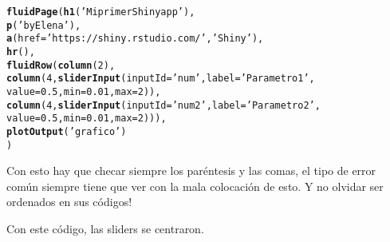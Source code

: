 \documentclass[11pt, oneside]{article}\usepackage[]{graphicx}\usepackage[]{color}
\makeatletter
\newcommand{\hlnum}[1]{\textcolor[rgb]{0.686,0.059,0.569}{#1}}%
\newcommand{\hlstr}[1]{\textcolor[rgb]{0.192,0.494,0.8}{#1}}%
\newcommand{\hlstd}[1]{\textcolor[rgb]{0.345,0.345,0.345}{#1}}%
\newcommand{\hlkwc}[1]{\textcolor[rgb]{0.333,0.667,0.333}{#1}}%
\newcommand{\hlkwd}[1]{\textcolor[rgb]{0.737,0.353,0.396}{\textbf{#1}}}%
\newenvironment{kframe}{%
 \def\at@end@of@kframe{}%
 \ifinner\ifhmode%
  \def\at@end@of@kframe{\end{minipage}}%
  \begin{minipage}{\columnwidth}%
 \fi\fi%
 \def\FrameCommand##1{\hskip\@totalleftmargin \hskip-\fboxsep
 \colorbox{shadecolor}{##1}\hskip-\fboxsep
     \hskip-\linewidth \hskip-\@totalleftmargin \hskip\columnwidth}%
 \MakeFramed {\advance\hsize-\width
   \@totalleftmargin\z@ \linewidth\hsize
   \@setminipage}}%
 {\par\unskip\endMakeFramed%
 \at@end@of@kframe}
\newenvironment{knitrout}{}{} %
\makeatother
\begin{document}
\begin{knitrout}
\color{fgcolor}\begin{kframe}
\begin{alltt}
\hlkwd{fluidPage}\hlstd{(}\hlkwd{h1}\hlstd{(}\hlstr{'Mi primer Shiny app'}\hlstd{),}
          \hlkwd{p}\hlstd{(}\hlstr{'by Elena'}\hlstd{),}
          \hlkwd{a}\hlstd{(}\hlkwc{href}\hlstd{=}\hlstr{'https://shiny.rstudio.com/'}\hlstd{,}\hlstr{'Shiny'}\hlstd{),}
          \hlkwd{hr}\hlstd{(),}
          \hlkwd{fluidRow}\hlstd{(}\hlkwd{column}\hlstd{(}\hlnum{2}\hlstd{),}
                   \hlkwd{column}\hlstd{(}\hlnum{4}\hlstd{,}\hlkwd{sliderInput}\hlstd{(}\hlkwc{inputId}\hlstd{=} \hlstr{'num'}\hlstd{,} \hlkwc{label}\hlstd{=}\hlstr{'Parametro 1'}\hlstd{,}
                      \hlkwc{value}\hlstd{=}\hlnum{0.5}\hlstd{,} \hlkwc{min}\hlstd{=}\hlnum{0.01}\hlstd{,} \hlkwc{max}\hlstd{=}\hlnum{2}\hlstd{)),}
                   \hlkwd{column}\hlstd{(}\hlnum{4}\hlstd{,}\hlkwd{sliderInput}\hlstd{(}\hlkwc{inputId}\hlstd{=} \hlstr{'num2'}\hlstd{,} \hlkwc{label}\hlstd{=}\hlstr{'Parametro 2'}\hlstd{,}
                      \hlkwc{value}\hlstd{=}\hlnum{0.5}\hlstd{,} \hlkwc{min}\hlstd{=}\hlnum{0.01}\hlstd{,}  \hlkwc{max}\hlstd{=}\hlnum{2}\hlstd{))),}
          \hlkwd{plotOutput}\hlstd{(}\hlstr{'grafico'}\hlstd{)}
\hlstd{)}
\end{alltt}
\end{kframe}
\end{knitrout}

Con esto hay que checar siempre los paréntesis y las comas, el tipo de error común siempre tiene que ver con la mala colocación de esto. Y no olvidar ser ordenados en sus códigos!

Con este código, las sliders se centraron. 
\end{document}
